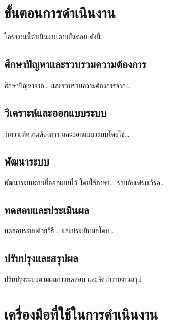 

\section{ขั้นตอนการดำเนินงาน}

โครงงานนี้ดำเนินงานตามขั้นตอน ดังนี้

\subsection{ศึกษาปัญหาและรวบรวมความต้องการ}

ศึกษาปัญหาจาก\ldots{} และรวบรวมความต้องการจาก\ldots{}

\subsection{วิเคราะห์และออกแบบระบบ}

วิเคราะห์ความต้องการ และออกแบบระบบโดยใช้\ldots{}

\subsection{พัฒนาระบบ}

พัฒนาระบบตามที่ออกแบบไว้ โดยใช้ภาษา\ldots{} ร่วมกับเฟรมเวิร์ค\ldots{}

\subsection{ทดสอบและประเมินผล}

ทดสอบระบบด้วยวิธี\ldots{} และประเมินผลโดย\ldots{}

\subsection{ปรับปรุงและสรุปผล}

ปรับปรุงระบบตามผลการทดสอบ และจัดทำรายงานสรุป

\section{เครื่องมือที่ใช้ในการดำเนินงาน}

